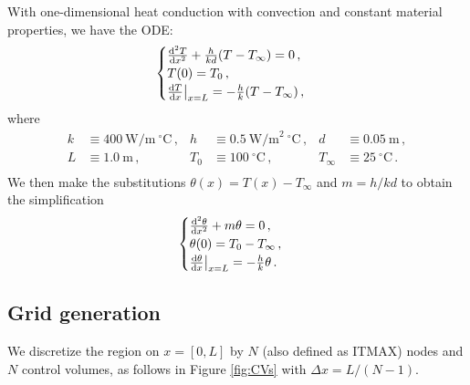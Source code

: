 \documentclass{article}
\begin{document}
With one-dimensional heat conduction with convection and constant material properties, we have the ODE:
\begin{equation}
	\begin{cases}
		\dv{^2T}{x^2} + \frac{h}{kd} (T - T_\infty) = 0\,,\\
		T(0) = T_0\,,\\
		\dv{T}{x} \big|_{x = L} = - \frac{h}{k} (T - T_\infty)\,,
	\end{cases}
\end{equation}
where
\begin{align*}
	k & \equiv 400~\text{W/m}~^\circ\text{C}\,, & h & \equiv 0.5~\text{W/m}^2~^\circ\text{C}\,, & d & \equiv 0.05~\text{m}\,,\\
	L & \equiv 1.0~\text{m}\,, & T_0 & \equiv 100~^\circ\text{C}\,, & T_\infty & \equiv 25~^\circ\text{C}\,.\\ 
\end{align*}
We then make the substitutions $\theta(x) = T(x) - T_\infty$ and $m = h/kd$ to obtain the simplification
\begin{equation}
	\begin{cases}
		\dv{^2\theta}{x^2} + m \theta = 0\,,\\
		\theta(0) = T_0 - T_\infty\,,\\
		\dv{\theta}{x} \big|_{x = L} = - \frac{h}{k} \theta\,.
	\end{cases}
	\end{equation}
	
\subsection*{Grid generation}

We discretize the region on $x = [0, L]$ by $N$ (also defined as ITMAX) nodes and $N$ control volumes, as follows in Figure \ref{fig:CVs} with $\Delta x = L / (N - 1)$.
\end{document}
